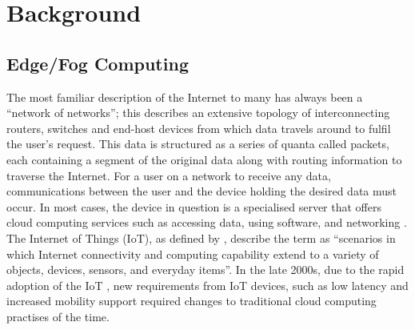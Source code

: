 \documentclass{l4proj}
\begin{document}
%
%
%
%
%

\chapter{Background}

\section{Edge/Fog Computing}
The most familiar description of the Internet to many has always been a ``network of networks''; this describes an extensive topology of interconnecting routers, switches and end-host devices from which data travels around to fulfil the user's request.
This data is structured as a series of quanta called packets, each containing a segment of the original data along with routing information to traverse the Internet.
For a user on a network to receive any data, communications between the user and the device holding the desired data must occur.
In most cases, the device in question is a specialised server that offers cloud computing services such as accessing data, using software, and networking \citep{cloud_computing}.
The Internet of Things (IoT), as defined by \cite{iot}, describe the term as ``scenarios in which Internet connectivity and computing capability extend to a variety of objects, devices, sensors, and everyday items''.
In the late 2000s, due to the rapid adoption of the IoT \citep{iotboom}, new requirements from IoT devices, such as low latency and increased mobility support \citep{fog_computing} required changes to traditional cloud computing practises of the time.
\end{document}
